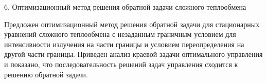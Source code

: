 6. Оптимизационный метод решения обратной задачи сложного теплообмена

Предложен оптимизационный метод решения обратной задачи для стационарных уравнений сложного
теплообмена с незаданным граничным условием для интенсивности излучения на части
границы и условием переопределения на другой части границы.
Приведен анализ краевой задачи оптимального управления и показано,
что последовательность решений задач управления сходится к решению обратной задачи.
